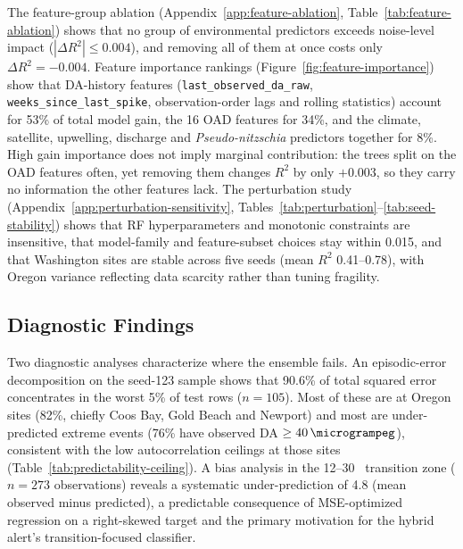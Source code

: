 \documentclass[toxins,article,submit,moreauthors]{Definitions/mdpi}
\begin{document}
\begin{sloppypar}
The feature-group ablation (Appendix~\ref{app:feature-ablation}, Table~\ref{tab:feature-ablation}) shows that no group of environmental predictors exceeds noise-level impact ($|\Delta R^2| \leq 0.004$), and removing all of them at once costs only $\Delta R^2 = -0.004$. Feature importance rankings (Figure~\ref{fig:feature-importance}) show that DA-history features (\texttt{last\_observed\_da\_raw}, \texttt{weeks\_since\_last\_spike}, observation-order lags and rolling statistics) account for 53\% of total model gain, the 16 OAD features for 34\%, and the climate, satellite, upwelling, discharge and \textit{Pseudo-nitzschia} predictors together for 8\%. High gain importance does not imply marginal contribution: the trees split on the OAD features often, yet removing them changes $R^2$ by only $+0.003$, so they carry no information the other features lack. The perturbation study (Appendix~\ref{app:perturbation-sensitivity}, Tables~\ref{tab:perturbation}--\ref{tab:seed-stability}) shows that RF hyperparameters and monotonic constraints are insensitive, that model-family and feature-subset choices stay within 0.015, and that Washington sites are stable across five seeds (mean $R^2$ 0.41--0.78), with Oregon variance reflecting data scarcity rather than tuning fragility.
\end{sloppypar}


\subsection{Diagnostic Findings}
\label{sec:results-diagnostics}

Two diagnostic analyses characterize where the ensemble fails. An episodic-error decomposition on the seed-123 sample shows that 90.6\% of total squared error concentrates in the worst 5\% of test rows ($n = 105$). Most of these are at Oregon sites (82\%, chiefly Coos Bay, Gold Beach and Newport) and most are under-predicted extreme events (76\% have observed DA $\geq \SI{40}{\microgrampeg}$), consistent with the low autocorrelation ceilings at those sites (Table~\ref{tab:predictability-ceiling}). A bias analysis in the 12--30~\si{\microgrampeg} transition zone ($n = 273$ observations) reveals a systematic under-prediction of \SI{4.8}{\microgrampeg} (mean observed minus predicted), a predictable consequence of MSE-optimized regression on a right-skewed target and the primary motivation for the hybrid alert's transition-focused classifier.

\end{document}
